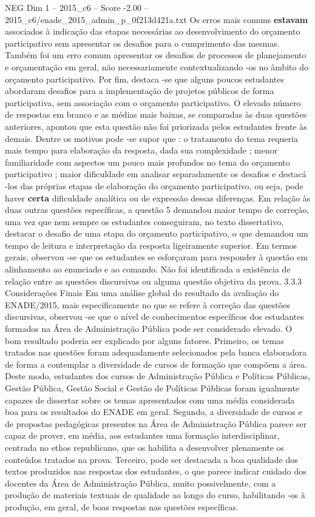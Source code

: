 \begin{textsample}{NEG Dim 1 – 2015\_c6 – Score -2.00 – 2015\_c6/enade\_2015\_admin\_p\_0f213d421a.txt}
Os erros mais comuns \textbf{estavam} associados à indicação das etapas necessárias ao desenvolvimento do orçamento participativo sem apresentar os desafios para o cumprimento das mesmas.
Também foi um erro comum apresentar os desafios de processos de planejamento e orçamentação em geral, não necessariamente contextualizando -os no âmbito do orçamento participativo.
Por fim, destaca -se que alguns poucos estudantes abordaram desafios para a implementação de projetos públicos de forma participativa, sem associação com o orçamento participativo.
O elevado número de respostas em branco e as médias mais baixas, se comparadas às duas questões anteriores, apontou que esta questão não foi priorizada pelos estudantes frente às demais.
Dentre os motivos pode -se supor que : o tratamento do tema requeria mais tempo para elaboração da resposta, dada sua complexidade ; menor familiaridade com aspectos um pouco mais profundos no tema do orçamento participativo ; maior dificuldade em analisar separadamente os desafios e destacá -los das próprias etapas de elaboração do orçamento participativo, ou seja, pode haver \textbf{certa} dificuldade analítica ou de expressão dessas diferenças.
Em relação às duas outras questões específicas, a questão 5 demandou maior tempo de correção, uma vez que nem sempre os estudantes conseguiram, no texto dissertativo, destacar o desafio de uma etapa do orçamento participativo, o que demandou um tempo de leitura e interpretação da resposta ligeiramente superior.
Em termos gerais, observou -se que os estudantes se esforçaram para responder à questão em alinhamento ao enunciado e ao comando.
Não foi identificada a existência de relação entre as questões discursivas ou alguma questão objetiva da prova. 3.3.3 Considerações Finais Em uma análise global do resultado da avaliação do ENADE/2015, mais especificamente no que se refere à correção das questões discursivas, observou -se que o nível de conhecimentos específicos dos estudantes formados na Área de Administração Pública pode ser considerado elevado.
O bom resultado poderia ser explicado por alguns fatores.
Primeiro, os temas tratados nas questões foram adequadamente selecionados pela banca elaboradora de forma a contemplar a diversidade de cursos de formação que compõem a área.
Deste modo, estudantes dos cursos de Administração Pública e Políticas Públicas, Gestão Pública, Gestão Social e Gestão de Políticas Públicas foram igualmente capazes de dissertar sobre os temas apresentados com uma média considerada boa para os resultados do ENADE em geral.
Segundo, a diversidade de cursos e de propostas pedagógicas presentes na Área de Administração Pública parece ser capaz de prover, em média, aos estudantes uma formação interdisciplinar, centrada no ethos republicano, que os habilita a desenvolver plenamente os conteúdos tratados na prova.
Terceiro, pode ser destacada a boa qualidade dos textos produzidos nas respostas dos estudantes, o que parece indicar cuidado dos docentes da Área de Administração Pública, muito possivelmente, com a produção de materiais textuais de qualidade ao longo do curso, habilitando -os à produção, em geral, de boas respostas nas questões específicas.

\end{textsample}
